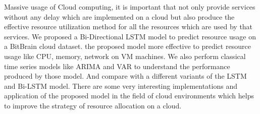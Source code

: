 Massive usage of Cloud computing, it is important that not only provide services without any delay which are implemented on a cloud but also produce the effective resource utilization method for all the resources which are used by that services. We proposed a Bi-Directional LSTM model to predict resource usage on a BitBrain cloud dataset. the proposed model more effective to predict resource usage like CPU, memory, network on VM machines. We also perform classical time series models like ARIMA and VAR to understand the performance produced by those model. And compare with a different variants of the LSTM and Bi-LSTM model. There are some very interesting implementations and application of the proposed model in the field of cloud environments which helps to improve the strategy of resource allocation on a cloud.